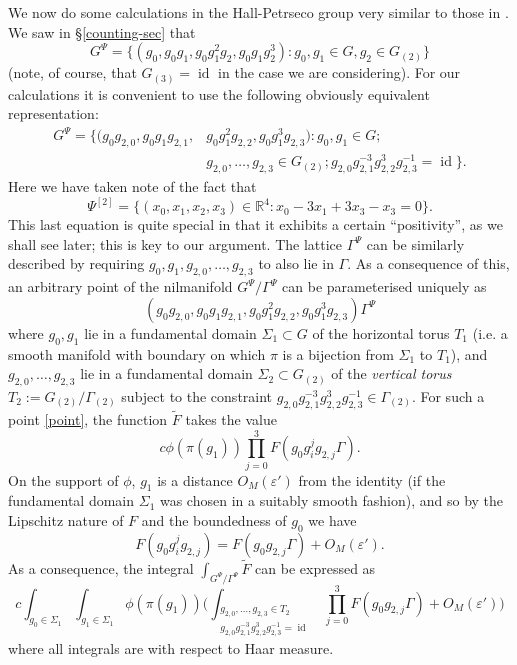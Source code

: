 \documentclass[11pt,reqno]{amsart}
\numberwithin{equation}{section}
\theoremstyle{plain}
\theoremstyle{definition}
\newcommand\R{\mathbb{R}}
\newcommand\1{{\bf 1}}
\newcommand\2{{\bf 2}}
\newcommand\eps{\varepsilon}
\newcommand\id{\operatorname{id}}
\begin{document}
We now do some calculations in the Hall-Petrseco group very similar to those in \cite{bergelson-host-kra}. We saw in \S \ref{counting-sec} that
\[ G^{\Psi} = \{ (g_0, g_0 g_1 , g_0 g_1^2 g_2, g_0 g_1 g_2^3) : g_0 , g_1 \in G, g_2 \in G_{(2)}\} \] (note, of course, that $G_{(3)} = \id$ in the case we are considering).
For our calculations it is convenient to use the following obviously equivalent representation:
\begin{align*} G^{\Psi} = \{ (g_0 g_{2,0}, g_0 g_1 g_{2,1}, &  g_0 g_1^2 g_{2,2}, g_0 g_1^3 g_{2,3}): g_0,g_1 \in G; \\ &  g_{2,0},\ldots,g_{2,3} \in G_{(2)}; g_{2,0} g_{2,1}^{-3} g_{2,2}^3 g_{2,3}^{-1} = \id \}.\end{align*}
Here we have taken note of the fact that 
\[ \Psi^{[2]} = \{ (x_0, x_1, x_2, x_3) \in \R^4 : x_0 - 3x_1 + 3x_3 - x_3 = 0\}.\] This last equation is quite special in that it exhibits a certain ``positivity'', as we shall see later; this is key to our argument. 
The lattice $\Gamma^{\Psi}$ can be similarly described by requiring $g_0, g_1, g_{2,0},\ldots,g_{2,3}$ to also lie in $\Gamma$.  As a consequence of this, an arbitrary point of the nilmanifold $G^{\Psi}/\Gamma^{\Psi}$ can be parameterised uniquely as
\begin{equation}\label{point}
 (g_0 g_{2,0}, g_0 g_1 g_{2,1}, g_0 g_1^2 g_{2,2}, g_0 g_1^3 g_{2,3}) \Gamma^{\Psi}
\end{equation}
where $g_0, g_1$ lie in a fundamental domain $\Sigma_1 \subset G$ of the horizontal torus $T_1$ (i.e. a smooth manifold with boundary on which $\pi$ is a bijection from $\Sigma_1$ to $T_1$), and $g_{2,0},\ldots,g_{2,3}$ lie in a fundamental domain $\Sigma_2 \subset G_{(2)}$ of the \emph{vertical torus} $T_2 := G_{(2)} / \Gamma_{(2)}$ subject to the constraint $g_{2,0} g_{2,1}^{-3} g_{2,2}^3 g_{2,3}^{-1} \in \Gamma_{(2)}$.  For such a point \eqref{point}, the function $\tilde F$ takes the value
$$ c \phi( \pi(g_1) ) \prod_{j=0}^3 F( g_0 g_i^j g_{2,j} \Gamma ).$$
On the support of $\phi$, $g_1$ is a distance $O_M(\eps')$ from the identity (if the fundamental domain $\Sigma_1$ was chosen in a suitably smooth fashion), and so by the Lipschitz nature of $F$ and the boundedness of $g_0$ we have
$$ F( g_0 g_i^j g_{2,j} ) = F( g_0 g_{2,j} \Gamma ) + O_M(\eps').$$
As a consequence, the integral $\int_{G^{\Psi}/\Gamma^{\Psi}} \tilde F$ can be expressed as
\begin{equation}\label{lam}
c \int_{g_0 \in \Sigma_1} \int_{g_1 \in \Sigma_1} \phi(\pi(g_1)) \big( \int_{\substack{g_{2,0},\ldots,g_{2,3} \in T_2\\ g_{2,0} g_{2,1}^{-3} g_{2,2}^3 g_{2,3}^{-1}=\id}} \prod_{j=0}^3 F( g_0 g_{2,j} \Gamma ) + O_M(\eps')\big)
\end{equation}
where all integrals are with respect to Haar measure.
\end{document}
